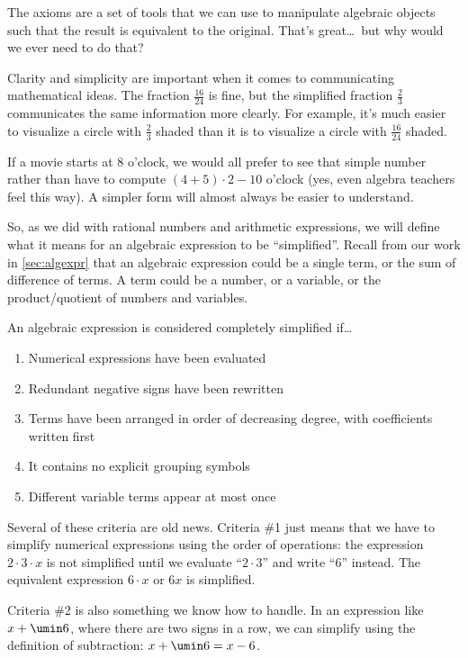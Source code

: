 The axioms are a set of tools that we can use to manipulate algebraic objects such that the result is equivalent to the original. That's great\ldots\ but why would we ever need to do that?

Clarity and simplicity are important when it comes to communicating mathematical ideas. The fraction $\frac{16}{24}$ is fine, but the simplified fraction $\frac{2}{3}$ communicates the same information more clearly. For example, it's much easier to visualize a circle with $\frac{2}{3}$ shaded than it is to visualize a circle with $\frac{16}{24}$ shaded.

If a movie starts at 8 o'clock, we would all prefer to see that simple number rather than have to compute $(4+5)\cdot2-10$ o'clock (yes, even algebra teachers feel this way). A simpler form will almost always be easier to understand.

So, as we did with rational numbers and arithmetic expressions, we will define what it means for an algebraic expression to be ``simplified''. Recall from our work in \cref{sec:algexpr} that an \gls{algebraic expression} could be a single term, or the sum of difference of terms. A \gls{term} could be a number, or a variable, or the product/quotient of numbers and variables.

\begin{boxedcriteria}
An algebraic expression is considered completely simplified if\ldots
\begin{enumerate}
	\item Numerical expressions have been evaluated
	\item Redundant negative signs have been rewritten
	\item Terms have been arranged in order of decreasing degree, with coefficients written first
	\item It contains no explicit grouping symbols
	\item Different variable terms appear at most once
\end{enumerate}
\end{boxedcriteria}

Several of these criteria are old news. Criteria \#1 just means that we have to simplify numerical expressions using the order of operations: the expression $2 \cdot 3 \cdot x$ is not simplified until we evaluate ``$2 \cdot 3$'' and write ``6'' instead. The equivalent expression $6 \cdot x$ or $6x$ is simplified.

Criteria \#2 is also something we know how to handle. In an expression like $x + \umin6$, where there are two signs in a row, we can simplify using the definition of subtraction: $x + \umin6 = x - 6$.


